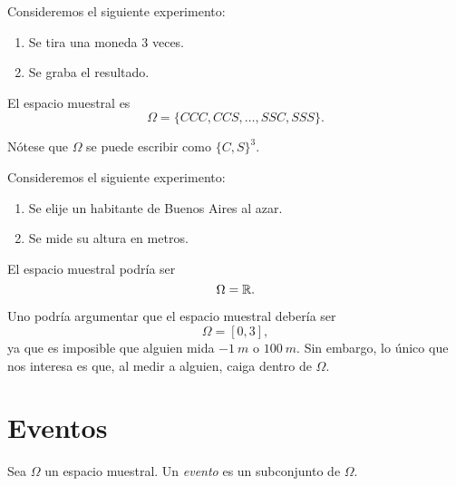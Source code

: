 \begin{example}
    Consideremos el siguiente experimento:
    \begin{centeredvarwidth}
        \begin{enumerate}
            \item Se tira una moneda $3$ veces.
            \item Se graba el resultado.
        \end{enumerate}
    \end{centeredvarwidth}

    El espacio muestral es
    \begin{equation*}
        \Omega = \{ CCC, CCS, \ldots, SSC, SSS \}.
    \end{equation*}
\end{example}

Nótese que $\Omega$ se puede escribir como $\{ C, S \}^3$.

\begin{example}
    Consideremos el siguiente experimento:
    \begin{centeredvarwidth}
        \begin{enumerate}
            \item Se elije un habitante de Buenos Aires al azar.
            \item Se mide su altura en metros.
        \end{enumerate}
    \end{centeredvarwidth}

    El espacio muestral podría ser
    \begin{equation*}
        \Omega = \mathbb{R}.
    \end{equation*}
\end{example}

Uno podría argumentar que el espacio muestral debería ser
\begin{equation*}
    \Omega = [0, 3],
\end{equation*}
ya que es imposible que alguien mida $\SI{-1}{m}$ o $\SI{100}{m}$. Sin embargo, lo único que nos interesa es que, al medir a alguien, caiga dentro de $\Omega$.


\section{Eventos}

\begin{definition}
    Sea $\Omega$ un espacio muestral. Un \emph{evento} es un subconjunto de $\Omega$.
\end{definition}


